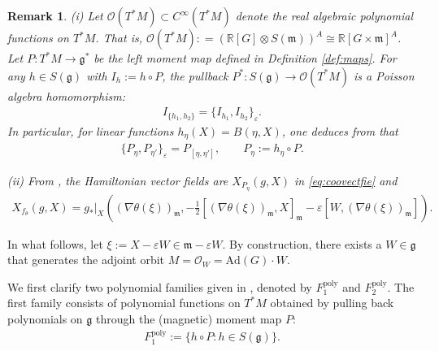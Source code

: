 \documentclass[11pt]{amsart}
\theoremstyle{definition}
\theoremstyle{plain}
\newtheorem{remark}[theorem]{Remark}
\theoremstyle{conclusion}
\begin{document}
 
\begin{remark} 
\label{rem:F1poly}
(i)  Let $\mathcal{O}(T^*M) \subset C^\infty(T^*M)$ denote the real algebraic polynomial functions on $T^*M$. That is, $\mathcal{O}(T^*M): = \left(\mathbb{R}[G] \otimes S(\mathfrak{m})\right)^A \cong \mathbb{R}[G \times \mathfrak{m}]^A$.  Let $P:T^*M\to\mathfrak{g}^*$ be the left moment map defined in Definition \ref{def:maps}. For any $h\in S(\mathfrak{g} )$ with $I_h:=h\circ P$, the pullback  $P^*:S(\mathfrak{g} )\to \mathcal{O}(T^*M)$ is a Poisson algebra homomorphism: \begin{align*}
    I_{\{h_1,h_2\}} =  \{I_{h_1},I_{h_2}\}_\varepsilon.
\end{align*}  In particular, for linear functions $h_\eta(X)=B(\eta,X)$, one deduces from \cite[Proposition 3]{MR2141306} that
\begin{align*}
    \{P_\eta,P_{\eta'}\}_\varepsilon =  P_{[\eta,\eta']}, \qquad P_\eta:=h_\eta\circ P.
\end{align*}  

(ii) From \cite{MR2141306}, the Hamiltonian vector fields are $ X_{P_\eta}(g,X)$ in \eqref{eq:coovectfie} and \begin{align}
  X_{f_\theta}(g,X)  =   g_*\vert_X \left((\nabla \theta(\xi))_\mathfrak{m}, - \frac{1}{2} [(\nabla \theta(\xi))_\mathfrak{m},X]_\mathfrak{m} - \varepsilon [W,(\nabla \theta(\xi))_\mathfrak{m}]\right).
\end{align} 
\end{remark}


 In what follows, let $\xi := X - \varepsilon W \in \mathfrak{m} - \varepsilon W$. By construction, there exists a $W \in \mathfrak{g}$ that generates the adjoint orbit $M = \mathcal{O}_W = \mathrm{Ad}(G)\cdot W$. %


We first clarify two polynomial families given in \cite{MR2141306}, denoted by $F_1^{\mathrm{poly}}$ and $F_2^{\mathrm{poly}}$. The first family consists of polynomial functions on $T^*M$ obtained by pulling back polynomials on $\mathfrak{g}$ through the (magnetic) moment map $P$:
\begin{align}
F_1^{\mathrm{poly}}:=\{h\circ P: h\in S(\mathfrak{g})\}.
\end{align}
\end{document}
